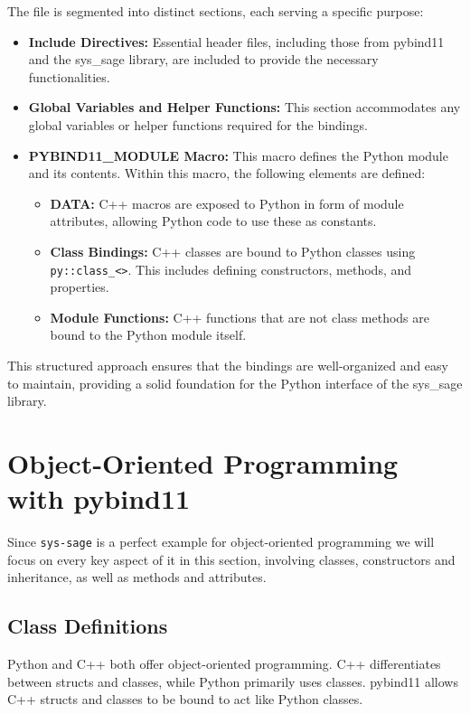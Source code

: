 The file is segmented into distinct sections, each serving a specific purpose:

\begin{itemize}
    \item   \textbf{Include Directives:} Essential header files, including those from pybind11 and the sys\_sage library, are included to provide the necessary functionalities.
    \item   \textbf{Global Variables and Helper Functions:} This section accommodates any global variables or helper functions required for the bindings.
    \item   \textbf{PYBIND11\_MODULE Macro:} This macro defines the Python module and its contents. Within this macro, the following elements are defined:
        \begin{itemize}
            \item   \textbf{DATA:} C++ macros are exposed to Python in form of module attributes, allowing Python code to use these as constants.
            \item   \textbf{Class Bindings:} C++ classes are bound to Python classes using \verb|py::class_<>|. This includes defining constructors, methods, and properties.
            \item   \textbf{Module Functions:} C++ functions that are not class methods are bound to the Python module itself.
        \end{itemize}
\end{itemize}

This structured approach ensures that the bindings are well-organized and easy to maintain, providing a solid foundation for the Python interface of the sys\_sage library.


\section{Object-Oriented Programming with pybind11}

Since \texttt{sys-sage} is a perfect example for object-oriented programming we will focus on every key aspect of it in this section, involving classes, constructors and inheritance, as well as methods and attributes.

\subsection{Class Definitions}

Python and C++ both offer object-oriented programming. C++ differentiates between structs and classes, while Python primarily uses classes. pybind11 allows C++ structs and classes to be bound to act like Python classes. \cite[see The Basics/Object-Oriented Code]{pybind11-docu}

